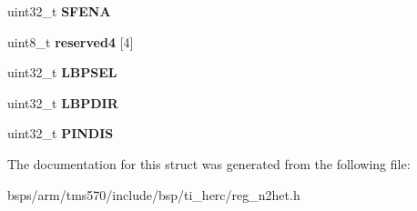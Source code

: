 \begin{DoxyCompactItemize}
uint32\+\_\+t {\bfseries S\+F\+E\+NA}
\item 
\mbox{\label{structtms570__nhet__t_a86f57ec6b8ad0b452890dfb4dd098be0}} 
uint8\+\_\+t {\bfseries reserved4} \mbox{[}4\mbox{]}
\item 
\mbox{\label{structtms570__nhet__t_aa19dc734ef12a7481eebda4af565764b}} 
uint32\+\_\+t {\bfseries L\+B\+P\+S\+EL}
\item 
\mbox{\label{structtms570__nhet__t_a3891e1da83190f2dd1d9c10c9e04c709}} 
uint32\+\_\+t {\bfseries L\+B\+P\+D\+IR}
\item 
\mbox{\label{structtms570__nhet__t_add71fa420245122658f03fb47c36b5d2}} 
uint32\+\_\+t {\bfseries P\+I\+N\+D\+IS}
\end{DoxyCompactItemize}


The documentation for this struct was generated from the following file\+:\begin{DoxyCompactItemize}
\item 
bsps/arm/tms570/include/bsp/ti\+\_\+herc/reg\+\_\+n2het.\+h\end{DoxyCompactItemize}
